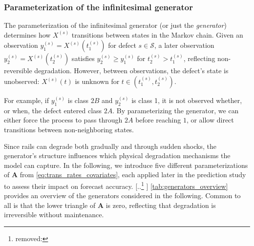 \documentclass{article}
\providecommand{\DIFadd}[1]{{\protect\color{blue} \sf #1}} %
\providecommand{\DIFdel}[1]{{\protect\color{red} [..\footnote{removed: #1} ]}} %
\providecommand{\DIFaddbegin}{} %
\providecommand{\DIFaddend}{} %
\providecommand{\DIFdelbegin}{} %
\providecommand{\DIFdelend}{} %
\begin{document}
\subsubsection{Parameterization of the infinitesimal generator} \label{sec:generator_params}
The parameterization of the infinitesimal generator (or just the \textit{generator}) determines how $X^{(s)}$ transitions between states in the Markov chain. 
Given an observation $y_1^{(s)} = X^{(s)}\left(t_1^{(s)}\right)$ for defect $s \in \mathcal{S}$, a later observation $y_2^{(s)} = X^{(s)}\left(t_2^{(s)}\right)$ satisfies $y_2^{(s)} \geq y_1^{(s)}$ for $t_2^{(s)} > t_1^{(s)}$, reflecting non-reversible degradation. However, between observations, the defect’s state is unobserved: $X^{(s)}(t)$ is unknown for $t \in \left(t_1^{(s)}, t_2^{(s)}\right)$.

For example, if $y_1^{(s)}$ is class $2B$ and $y_2^{(s)}$ is class 1, it is not observed whether, or when, the defect entered class $2A$. By parameterizing the generator, we can either force the process to pass through $2A$ before reaching $1$, or allow direct transitions between non-neighboring states. 

Since rails can degrade both gradually and through sudden shocks, the generator’s structure influences which physical degradation mechanisms the model can capture. In the following, we introduce five different parameterizations of $\bm{A}$ from \cref{eq:trans_rates_covariates}, each applied later in the prediction study to assess their impact on forecast accuracy. \DIFdelbegin \DIFdel{ }\DIFdelend \DIFaddbegin \DIFadd{\cref{tab:generators_overview} }\DIFaddend provides an overview of the generators considered in the following. Common to all is that the lower triangle of $\bm{A}$ is zero, reflecting that degradation is irreversible without maintenance.
\end{document}
